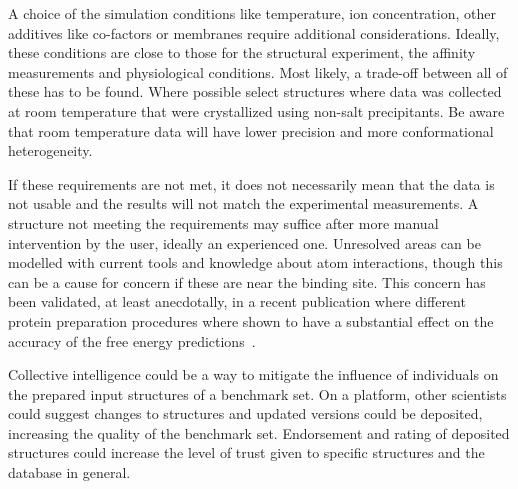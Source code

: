 \documentclass[9pt,bestpractices,pubversion]{livecoms}
\begin{document}
A choice of the simulation conditions like temperature, ion concentration, other additives like co-factors or membranes require additional considerations. Ideally, these conditions are close to those for the structural experiment, the affinity measurements and physiological conditions. Most likely, a trade-off between all of these has to be found. Where possible select structures where data was collected at room temperature that were crystallized using non-salt precipitants. Be aware that room temperature data will have lower precision and more conformational heterogeneity.
    
%
If these requirements are not met, it does not necessarily mean that the data is not usable and the results will not match the experimental measurements. A structure not meeting the requirements may suffice after more manual intervention by the user, ideally an experienced one. Unresolved areas can be modelled with current tools and knowledge about atom interactions, though this can be a cause for concern if these are near the binding site. This concern has been validated, at least anecdotally, in a recent publication where different protein preparation procedures where shown to have a substantial effect on the accuracy of the free energy predictions~\cite{shih_impact_2020}.


Collective intelligence could be a way to mitigate the influence of individuals on the prepared input structures of a benchmark set. On a platform, other scientists could suggest changes to structures and updated versions could be deposited, increasing the quality of the benchmark set. Endorsement and rating of deposited structures could increase the level of trust given to specific structures and the database in general.
\end{document}
